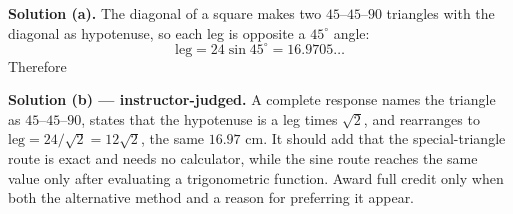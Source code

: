 \documentclass[12pt]{article}
\begin{document}
\noindent\textbf{Solution (a).} The diagonal of a square makes two
$45$--$45$--$90$ triangles with the diagonal as hypotenuse, so each leg is
opposite a $45^\circ$ angle:
\[ \text{leg} = 24 \sin 45^\circ = 16.9705\ldots \]
Therefore 

\noindent\textbf{Solution (b) --- instructor-judged.} A complete response names
the triangle as $45$--$45$--$90$, states that the hypotenuse is a leg times
$\sqrt{2}$, and rearranges to $\text{leg} = 24/\sqrt{2} = 12\sqrt{2}$, the same
$16.97$ cm. It should add that the special-triangle route is exact and needs no
calculator, while the sine route reaches the same value only after evaluating a
trigonometric function. Award full credit only when both the alternative method
and a reason for preferring it appear.
\end{document}
